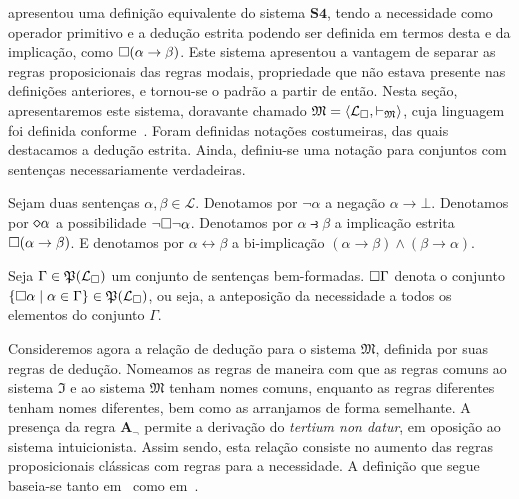 \vspace{0.5\baselineskip}
\cite{Gödel.1986b} apresentou uma definição equivalente do sistema $\mathbf{S4}$, tendo a necessidade como operador primitivo e a dedução estrita podendo ser definida em termos desta e da implicação, como $\Box(\alpha\to\beta)$.
Este sistema apresentou a vantagem de separar as regras proposicionais das regras modais, propriedade que não estava presente nas definições anteriores, e tornou-se o padrão a partir de então.
Nesta seção, apresentaremos este sistema, doravante chamado $\mathfrak{M}=\langle\mathcal{L}_\Box,\vdash_\mathfrak{M}\rangle$, cuja linguagem foi definida conforme~\cite{Troelstra+Schwichtenberg.2000}.
Foram definidas notações costumeiras, das quais destacamos a dedução estrita.
Ainda, definiu-se uma notação para conjuntos com sentenças necessariamente verdadeiras.

\vspace{0.5\baselineskip}
\begin{tcolorbox}[enhanced jigsaw, breakable, sharp corners, colframe=black, colback=white, boxrule=0.5pt, left=1.5mm, right=1.5mm, top=1.5mm, bottom=1.5mm]
\begin{notation}
    Sejam duas sentenças $\alpha,\beta\in\mathcal{L}$.
    Denotamos por $\neg\alpha$ a negação $\alpha\to\bot$.
    Denotamos por $\pos\alpha$ a possibilidade $\neg\Box\neg\alpha$.
    Denotamos por $\alpha\strictif\beta$ a implicação estrita $\Box(\alpha\to\beta)$.
    E denotamos por $\alpha\leftrightarrow\beta$ a bi-implicação $(\alpha\to\beta)\wedge(\beta\to\alpha)$.
\end{notation}
\end{tcolorbox}

\begin{tcolorbox}[enhanced jigsaw, breakable, sharp corners, colframe=black, colback=white, boxrule=0.5pt, left=1.5mm, right=1.5mm, top=1.5mm, bottom=1.5mm]
\begin{notation}
    Seja $\Gamma\in\mathfrak{P}(\mathcal{L}_{\Box})$ um conjunto de sentenças bem-formadas.
    $\Box\Gamma$ denota o conjunto $\left\{\Box\alpha\mid\alpha\in\Gamma\right\}\in\mathfrak{P}(\mathcal{L}_{\Box})$, ou seja, a anteposição da necessidade a todos os elementos do conjunto $\Gamma$.
\end{notation}
\end{tcolorbox}

\vspace{0.5\baselineskip}
Consideremos agora a relação de dedução para o sistema $\mathfrak{M}$, definida por suas regras de dedução.
Nomeamos as regras de maneira com que as regras comuns ao sistema $\mathfrak{I}$ e ao sistema $\mathfrak{M}$ tenham nomes comuns, enquanto as regras diferentes tenham nomes diferentes, bem como as arranjamos de forma semelhante.
A presença da regra $\mathbf{A_\neg}$ permite a derivação do \emph{tertium non datur}, em oposição ao sistema intuicionista.
Assim sendo, esta relação consiste no aumento das regras proposicionais clássicas com regras para a necessidade.
A definição que segue baseia-se tanto em~\cite{Troelstra+Schwichtenberg.2000} como em~\cite{Hakli+Negri.2012}.

